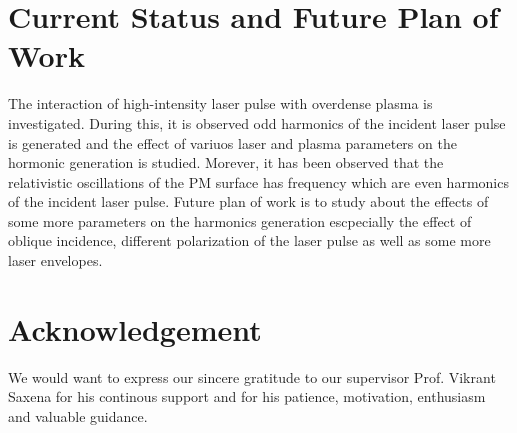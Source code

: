 \documentclass[12pt]{article}
\newenvironment{changemargin}[2]{
\begin{list}{}{
\setlength{\topsep}{0pt}
\setlength{\leftmargin}{#1}
\setlength{\rightmargin}{#2}
\setlength{\listparindent}{\parindent}
\setlength{\itemindent}{\parindent}
\setlength{\parsep}{\parskip}
}
\item[]}{\end{list}}
\begin{document}
\begin{changemargin}{-2cm}{-2cm}
    \section{Current Status and Future Plan of Work}
    The interaction of high-intensity laser pulse with overdense plasma is investigated. During this, it is observed odd harmonics of the incident laser pulse is generated and the effect of variuos laser and plasma parameters on the hormonic generation is studied. Morever, it has been observed that the relativistic oscillations of the PM surface has frequency which are even harmonics of the incident laser pulse. Future plan of work is to study about the effects of some more parameters on the harmonics generation escpecially the effect of oblique incidence, different polarization of the laser pulse as well as some more laser envelopes.

    \section{Acknowledgement}
    We would want to express our sincere gratitude to our supervisor Prof. Vikrant Saxena for his continous support and for his patience, motivation, enthusiasm and valuable guidance.

    \printbibliography
\end{changemargin}
\end{document}
